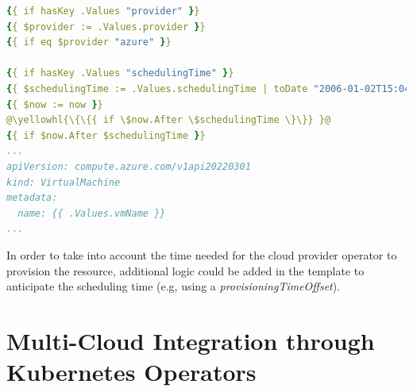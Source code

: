 \begin{lstlisting}[language=yaml, caption={Scheduling time}, label={lst:sched}]
{{ if hasKey .Values "provider" }}
{{ $provider := .Values.provider }}
{{ if eq $provider "azure" }}

{{ if hasKey .Values "schedulingTime" }}
{{ $schedulingTime := .Values.schedulingTime | toDate "2006-01-02T15:04:05Z" }}
{{ $now := now }}
@\yellowhl{\{\{{ if \$now.After \$schedulingTime \}\}} }@
{{ if $now.After $schedulingTime }}
...
apiVersion: compute.azure.com/v1api20220301
kind: VirtualMachine
metadata:
  name: {{ .Values.vmName }}
...
\end{lstlisting}

In order to take into account the time needed for the cloud provider operator to provision the resource, additional logic could be added in the template to anticipate the scheduling time (e.g, using a \textit{provisioningTimeOffset}).

\section{Multi-Cloud Integration through Kubernetes Operators}
\label{sec:cloud_providers_operators}

